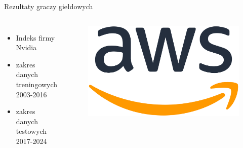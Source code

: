 \begin{frame}{Rezultaty graczy giełdowych}
    \begin{columns}[t]
            \begin{itemize}
                \item Indeks firmy Nvidia
                \item zakres danych treningowych 2003-2016
                \item zakres danych testowych 2017-2024
            \end{itemize}
        \centering
        \begin{figure}
            \centering
            \includegraphics[width=1\textwidth]{images/aws_logo.png}
        \end{figure}    
    \end{columns}
\end{frame}
